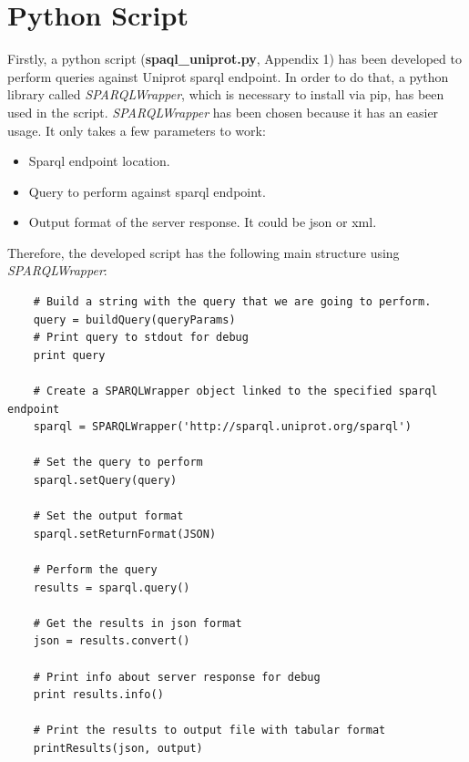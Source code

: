 \documentclass[12pt]{article}
\begin{document}
\section{Python Script}
Firstly, a python script (\textbf{spaql\_uniprot.py}, Appendix 1) has been developed to perform queries against Uniprot sparql endpoint. In order to do that, a python library called \textit{SPARQLWrapper}, which is necessary to install via pip, has been used in the script. \textit{SPARQLWrapper} has been chosen because it has an easier usage. It only takes a few parameters to work:
\begin{itemize}
	\item Sparql endpoint location.
	\item Query to perform against sparql endpoint.
	\item Output format of the server response. It could be json or xml.
\end{itemize}
Therefore, the developed script has the following main structure using \textit{SPARQLWrapper}:
\begin{verbatim}
	# Build a string with the query that we are going to perform.
	query = buildQuery(queryParams)
	# Print query to stdout for debug
	print query
	
	# Create a SPARQLWrapper object linked to the specified sparql endpoint
	sparql = SPARQLWrapper('http://sparql.uniprot.org/sparql')

	# Set the query to perform
	sparql.setQuery(query)

	# Set the output format
	sparql.setReturnFormat(JSON)

	# Perform the query
	results = sparql.query()

	# Get the results in json format
	json = results.convert()

	# Print info about server response for debug
	print results.info()

	# Print the results to output file with tabular format
	printResults(json, output)
\end{verbatim}
\end{document}

